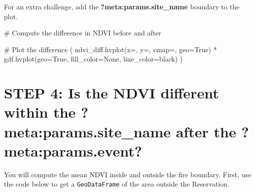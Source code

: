 \documentclass[
  letterpaper,
  DIV=11,
  numbers=noendperiod,
  oneside]{scrreprt}
\newenvironment{Shaded}{\begin{snugshade}}{\end{snugshade}}
\newcommand{\CommentTok}[1]{\textcolor[rgb]{0.37,0.37,0.37}{#1}}
\newcommand{\NormalTok}[1]{\textcolor[rgb]{0.00,0.23,0.31}{#1}}
\newcommand{\OperatorTok}[1]{\textcolor[rgb]{0.37,0.37,0.37}{#1}}
\newcommand{\StringTok}[1]{\textcolor[rgb]{0.13,0.47,0.30}{#1}}
\newcommand{\VariableTok}[1]{\textcolor[rgb]{0.07,0.07,0.07}{#1}}
\begin{document}
\begin{tcolorbox}[enhanced jigsaw, colbacktitle=quarto-callout-color!10!white, opacityback=0, bottomtitle=1mm, toptitle=1mm, bottomrule=.15mm, left=2mm, colframe=quarto-callout-color-frame, leftrule=.75mm, opacitybacktitle=0.6, colback=white, rightrule=.15mm, toprule=.15mm, breakable, titlerule=0mm, title=\textcolor{quarto-callout-color}{\faInfo}\hspace{0.5em}{Looking for an Extra Challenge?}, coltitle=black, arc=.35mm]

For an extra challenge, add the \textbf{?meta:params.site\_name}
boundary to the plot.

\end{tcolorbox}

\begin{Shaded}
\begin{Highlighting}[]
\CommentTok{\# Compute the difference in NDVI before and after}

\CommentTok{\# Plot the difference}
\NormalTok{(}
\NormalTok{    ndvi\_diff.hvplot(x}\OperatorTok{=}\StringTok{\textquotesingle{}\textquotesingle{}}\NormalTok{, y}\OperatorTok{=}\StringTok{\textquotesingle{}\textquotesingle{}}\NormalTok{, cmap}\OperatorTok{=}\StringTok{\textquotesingle{}\textquotesingle{}}\NormalTok{, geo}\OperatorTok{=}\VariableTok{True}\NormalTok{)}
    \OperatorTok{*}
\NormalTok{    gdf.hvplot(geo}\OperatorTok{=}\VariableTok{True}\NormalTok{, fill\_color}\OperatorTok{=}\VariableTok{None}\NormalTok{, line\_color}\OperatorTok{=}\StringTok{\textquotesingle{}black\textquotesingle{}}\NormalTok{)}
\NormalTok{)}
\end{Highlighting}
\end{Shaded}


\chapter{\texorpdfstring{STEP 4: Is the NDVI different within the
\textbf{?meta:params.site\_name} after the
\textbf{?meta:params.event}?}{STEP 4: Is the NDVI different within the ?meta:params.site\_name after the ?meta:params.event?}}\label{step-4-is-the-ndvi-different-within-the-after-the}

You will compute the mean NDVI inside and outside the fire boundary.
First, use the code below to get a \texttt{GeoDataFrame} of the area
outside the Reservation.
\end{document}
